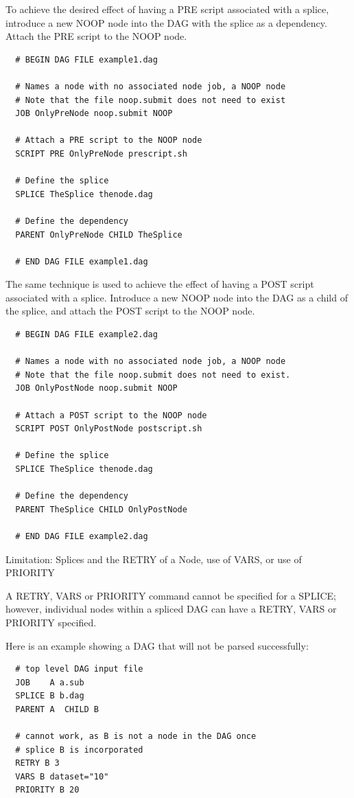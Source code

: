 To achieve the desired effect of having a PRE script associated with a splice,
introduce a new NOOP node into the DAG with the splice as a dependency.
Attach the PRE script to the NOOP node.
\footnotesize
\begin{verbatim}
  # BEGIN DAG FILE example1.dag

  # Names a node with no associated node job, a NOOP node
  # Note that the file noop.submit does not need to exist
  JOB OnlyPreNode noop.submit NOOP

  # Attach a PRE script to the NOOP node
  SCRIPT PRE OnlyPreNode prescript.sh

  # Define the splice
  SPLICE TheSplice thenode.dag
 
  # Define the dependency
  PARENT OnlyPreNode CHILD TheSplice

  # END DAG FILE example1.dag
\end{verbatim}
\normalsize

The same technique is used to achieve the effect of having a POST script
associated with a splice.
Introduce a new NOOP node into the DAG as a child of the splice, 
and attach the POST script to the NOOP node.

\footnotesize
\begin{verbatim}
  # BEGIN DAG FILE example2.dag

  # Names a node with no associated node job, a NOOP node
  # Note that the file noop.submit does not need to exist.
  JOB OnlyPostNode noop.submit NOOP

  # Attach a POST script to the NOOP node
  SCRIPT POST OnlyPostNode postscript.sh

  # Define the splice
  SPLICE TheSplice thenode.dag
 
  # Define the dependency
  PARENT TheSplice CHILD OnlyPostNode

  # END DAG FILE example2.dag
\end{verbatim}
\normalsize

\begin{description}
\item[Limitation: Splices and the RETRY of a Node, use of VARS, or use of PRIORITY]
\end{description}

A RETRY, VARS or PRIORITY command cannot be specified for a SPLICE;
however, individual nodes within a spliced DAG can have a RETRY, VARS
or PRIORITY specified.

Here is an example showing a DAG that will not be parsed successfully:
\begin{verbatim}
  # top level DAG input file
  JOB    A a.sub
  SPLICE B b.dag
  PARENT A  CHILD B

  # cannot work, as B is not a node in the DAG once
  # splice B is incorporated
  RETRY B 3
  VARS B dataset="10"
  PRIORITY B 20
\end{verbatim}

